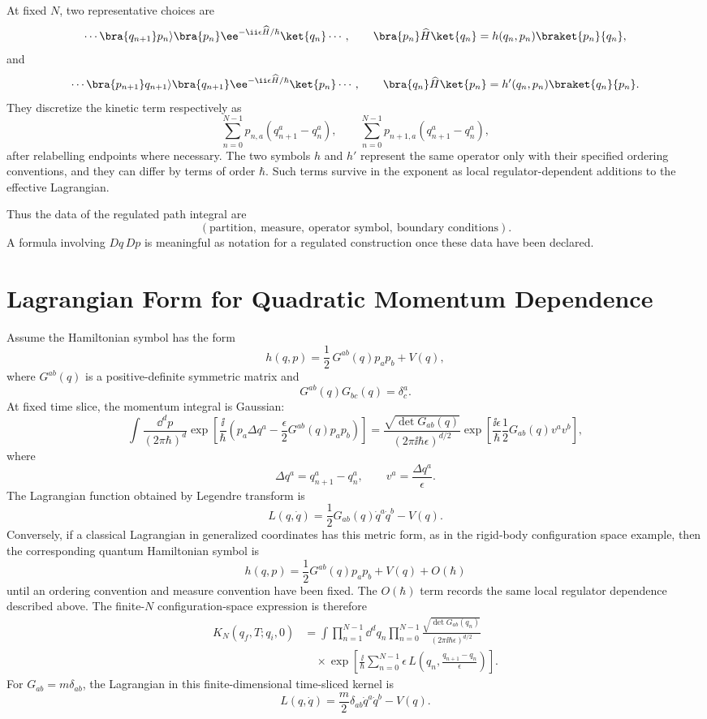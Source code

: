 At fixed \(N\), two representative choices are
\[
  \cdots
  \bra{q_{n+1}}p_n\rangle
  \bra{p_n}\ee^{-\ii\epsilon\widehat H/\hbar}\ket{q_n}
  \cdots,
  \qquad
  \bra{p_n}\widehat H\ket{q_n}
  =
  h(q_n,p_n)\braket{p_n}{q_n},
\]
and
\[
  \cdots
  \bra{p_{n+1}}q_{n+1}\rangle
  \bra{q_{n+1}}\ee^{-\ii\epsilon\widehat H/\hbar}\ket{p_n}
  \cdots,
  \qquad
  \bra{q_n}\widehat H\ket{p_n}
  =
  h'(q_n,p_n)\braket{q_n}{p_n}.
\]
They discretize the kinetic term respectively as
\[
  \sum_{n=0}^{N-1}p_{n,a}(q_{n+1}^a-q_n^a),
  \qquad
  \sum_{n=0}^{N-1}p_{n+1,a}(q_{n+1}^a-q_n^a),
\]
after relabelling endpoints where necessary.  The two symbols \(h\) and
\(h'\) represent the same operator only with their specified ordering
conventions, and they can differ by terms of order \(\hbar\).  Such terms
survive in the exponent as local regulator-dependent additions to the
effective Lagrangian.

Thus the data of the regulated path integral are
\[
  (\text{partition},\ \text{measure},\ \text{operator symbol},\
  \text{boundary conditions}).
\]
A formula involving \(Dq\,Dp\) is meaningful as notation for a regulated
construction once these data have been declared.

\section{Lagrangian Form for Quadratic Momentum Dependence}

Assume the Hamiltonian symbol has the form
\[
  h(q,p)
  =
  \frac12\,G^{ab}(q)p_ap_b+V(q),
\]
where \(G^{ab}(q)\) is a positive-definite symmetric matrix and
\[
  G^{ab}(q)G_{bc}(q)=\delta^a_c.
\]
At fixed time slice, the momentum integral is Gaussian:
\[
  \int\frac{\dd^dp}{(2\pi\hbar)^d}
  \exp\left[
    \frac{\ii}{\hbar}
    \left(
      p_a\Delta q^a
      -\frac{\epsilon}{2}G^{ab}(q)p_ap_b
    \right)
  \right]
  =
  \frac{\sqrt{\det G_{ab}(q)}}{(2\pi\ii\hbar\epsilon)^{d/2}}
  \exp\left[
    \frac{\ii\epsilon}{\hbar}
    \frac12G_{ab}(q)v^av^b
  \right],
\]
where
\[
  \Delta q^a=q_{n+1}^a-q_n^a,
  \qquad
  v^a=\frac{\Delta q^a}{\epsilon}.
\]
The Lagrangian function obtained by Legendre transform is
\[
  L(q,\dot q)
  =
  \frac12G_{ab}(q)\dot q^a\dot q^b-V(q).
\]
Conversely, if a classical Lagrangian in generalized coordinates has this
metric form, as in the rigid-body configuration space example, then the
corresponding quantum Hamiltonian symbol is
\[
  h(q,p)=\frac12G^{ab}(q)p_ap_b+V(q)+O(\hbar)
\]
until an ordering convention and measure convention have been fixed.  The
\(O(\hbar)\) term records the same local regulator dependence described
above.
The finite-\(N\) configuration-space expression is therefore
\[
\begin{aligned}
  K_N(q_f,T;q_i,0)
  &=
  \int\prod_{n=1}^{N-1}\dd^dq_n
  \prod_{n=0}^{N-1}
  \frac{\sqrt{\det G_{ab}(q_n)}}{(2\pi\ii\hbar\epsilon)^{d/2}}
  \\
  &\quad\times
  \exp\left[
    \frac{\ii}{\hbar}
    \sum_{n=0}^{N-1}
    \epsilon\,
    L\left(q_n,\frac{q_{n+1}-q_n}{\epsilon}\right)
  \right].
\end{aligned}
\]
For \(G_{ab}=m\delta_{ab}\), the Lagrangian in this finite-dimensional
time-sliced kernel is
\[
  L(q,\dot q)=\frac{m}{2}\delta_{ab}\dot q^a\dot q^b-V(q).
\]

